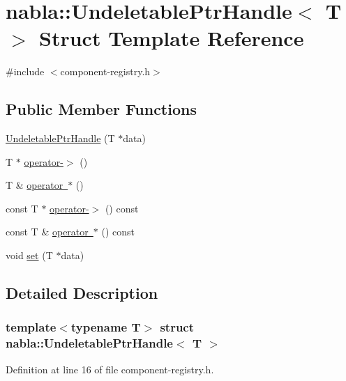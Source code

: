 \hypertarget{structnabla_1_1_undeletable_ptr_handle}{}\section{nabla\+::Undeletable\+Ptr\+Handle$<$ T $>$ Struct Template Reference}
\label{structnabla_1_1_undeletable_ptr_handle}


{\ttfamily \#include $<$component-\/registry.\+h$>$}

\subsection*{Public Member Functions}
\begin{DoxyCompactItemize}
\item 
\mbox{\hyperlink{structnabla_1_1_undeletable_ptr_handle_afd1796a0e126eefde86a3cfd2f166238}{Undeletable\+Ptr\+Handle}} (T $\ast$data)
\item 
T $\ast$ \mbox{\hyperlink{structnabla_1_1_undeletable_ptr_handle_ac8a3d97fd2186ea1d1c48041dc4fedcf}{operator-\/$>$}} ()
\item 
T \& \mbox{\hyperlink{structnabla_1_1_undeletable_ptr_handle_a0d2936bd624f9b93e5772111525dab7b}{operator $\ast$}} ()
\item 
const T $\ast$ \mbox{\hyperlink{structnabla_1_1_undeletable_ptr_handle_a6254f505504dd4ee4d560305988e124c}{operator-\/$>$}} () const
\item 
const T \& \mbox{\hyperlink{structnabla_1_1_undeletable_ptr_handle_a1cce9ea2ea5c3cb103f59c335267e7e7}{operator $\ast$}} () const
\item 
void \mbox{\hyperlink{structnabla_1_1_undeletable_ptr_handle_abcc6e0af30f6f48f38a7319c5e282331}{set}} (T $\ast$data)
\end{DoxyCompactItemize}


\subsection{Detailed Description}
\subsubsection*{template$<$typename T$>$\newline
struct nabla\+::\+Undeletable\+Ptr\+Handle$<$ T $>$}



Definition at line 16 of file component-\/registry.\+h.




